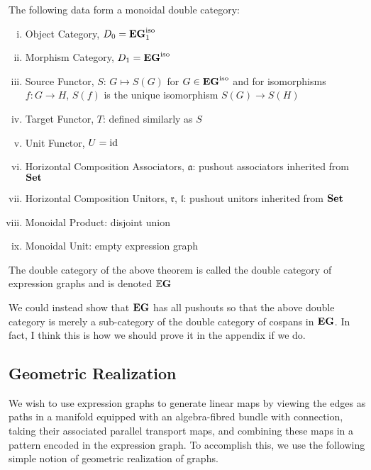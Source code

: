 \documentclass[./Thick_TQFTs_and_Quantum_Information.tex]{subfiles}
\begin{document}
\begin{thm}
The following data form a monoidal double category:
\begin{enumerate}[(i)]
\setlength{\itemsep}{0pt}
\item Object Category, $D_0 = \textbf{EG}_1^{\text{iso}}$
\item Morphism Category, $D_1 = \textbf{EG}^{\text{iso}}$
\item Source Functor, $S$: $G \mapsto S(G)$ for $G \in \textbf{EG}^{\text{iso}}$ and
for isomorphisms $f : G \to H$, $S(f)$ is the unique isomorphism $S(G) \to S(H)$
\item Target Functor, $T$: defined similarly as $S$
\item Unit Functor, $U = \text{id}$
\item Horizontal Composition Associators, $\mathfrak{a}$: pushout associators
inherited from $\textbf{Set}$
\item Horizontal Composition Unitors, $\mathfrak{r}$, $\mathfrak{l}$: pushout
unitors inherited from $\textbf{Set}$
\item Monoidal Product: disjoint union
\item Monoidal Unit: empty expression graph
\end{enumerate}
\end{thm}

\begin{defn}
The double category of the above theorem is called the double category of
expression graphs and is denoted $\mathbb{E}\textbf{G}$
\end{defn}

\begin{rmk}
We could instead show that $\textbf{EG}$ has all pushouts so that the above double
category is merely a sub-category of the double category of cospans in $\textbf{EG}$. In
fact, I think this is how we should prove it in the appendix if we do.
\end{rmk}

\subsection{Geometric Realization}

We wish to use expression graphs to generate linear maps by viewing the edges as
paths in a manifold equipped with an algebra-fibred bundle with connection,
taking their associated parallel transport maps, and combining these maps in a
pattern encoded in the expression graph. To accomplish this, we use the
following simple notion of geometric realization of graphs.
\end{document}
